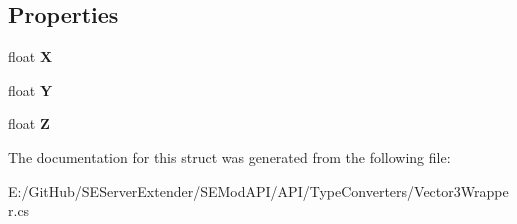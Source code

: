 \subsection*{Properties}
\begin{DoxyCompactItemize}
\item 
\hypertarget{struct_s_e_mod_a_p_i_1_1_a_p_i_1_1_type_converters_1_1_vector3_wrapper_ae2202b38c2e7e587a8c8a7fd7fe64420}{}float {\bfseries X}\label{struct_s_e_mod_a_p_i_1_1_a_p_i_1_1_type_converters_1_1_vector3_wrapper_ae2202b38c2e7e587a8c8a7fd7fe64420}

\item 
\hypertarget{struct_s_e_mod_a_p_i_1_1_a_p_i_1_1_type_converters_1_1_vector3_wrapper_a058a77fd1951cd65e7637e6803eba638}{}float {\bfseries Y}\label{struct_s_e_mod_a_p_i_1_1_a_p_i_1_1_type_converters_1_1_vector3_wrapper_a058a77fd1951cd65e7637e6803eba638}

\item 
\hypertarget{struct_s_e_mod_a_p_i_1_1_a_p_i_1_1_type_converters_1_1_vector3_wrapper_a18b5a189bc5ba4b1e043e59abd6de5cf}{}float {\bfseries Z}\label{struct_s_e_mod_a_p_i_1_1_a_p_i_1_1_type_converters_1_1_vector3_wrapper_a18b5a189bc5ba4b1e043e59abd6de5cf}

\end{DoxyCompactItemize}


The documentation for this struct was generated from the following file\+:\begin{DoxyCompactItemize}
\item 
E\+:/\+Git\+Hub/\+S\+E\+Server\+Extender/\+S\+E\+Mod\+A\+P\+I/\+A\+P\+I/\+Type\+Converters/Vector3\+Wrapper.\+cs\end{DoxyCompactItemize}
